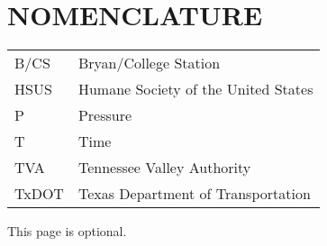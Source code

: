 %
%
%


\chapter*{NOMENCLATURE}

\begin{tabular}{ll}
B/CS  & Bryan/College Station\tabularnewline
HSUS & Humane Society of the United States\tabularnewline
P & Pressure\tabularnewline
T  & Time\tabularnewline
TVA & Tennessee Valley Authority\tabularnewline
TxDOT \hfill{}\hfill{}\hfill{}\hfill{}\hfill{}\hfill{}\hfill{}\hfill{} & \multicolumn{1}{l}{Texas Department of Transportation}\tabularnewline
\end{tabular}

\vspace{2em}

This page is optional.

\pagebreak{}
